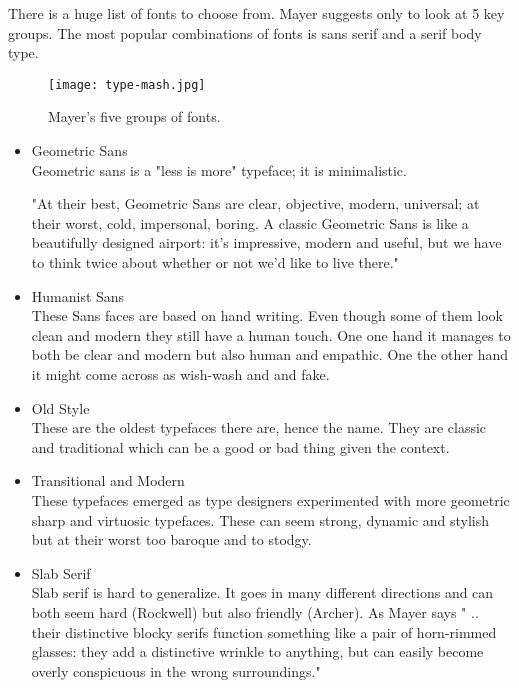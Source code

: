There is a huge list of fonts to choose from. Mayer suggests only to look at 5 key groups.
The most popular combinations of fonts is sans serif and a serif body type. \cite{TypeComb} 

\begin{figure}[H]
\centering
\texttt{[image: type-mash.jpg]}
\caption{Mayer's five groups of fonts. \cite{Font}}
\end{figure}

\begin{itemize}

\item
Geometric Sans
\\
Geometric sans is a "less is more" typeface; it is minimalistic.

"At their best, Geometric Sans are clear, objective, modern, universal; at their worst, cold, impersonal, boring. A classic Geometric Sans is like a beautifully designed airport: it's impressive, modern and useful, but we have to think twice about whether or not we'd like to live there." \cite{Font} %

\item
Humanist Sans
\\
These Sans faces are based on hand writing. Even though some of them look clean and modern they still have a human touch. One one hand it manages to both be clear and modern but also human and empathic. One the other hand it might come across as wish-wash and and fake. \cite{Font}

\item
Old Style
\\
These are the oldest typefaces there are, hence the name. 
They are classic and traditional which can be a good or bad thing given the context. 

\item
Transitional and Modern
\\
These typefaces emerged as type designers experimented with more geometric sharp and virtuosic typefaces. 
These can seem strong, dynamic and stylish but at their worst too baroque and to stodgy. \cite{Font} 

\item
Slab Serif
\\
Slab serif is hard to generalize. It goes in many different directions and can both seem hard (Rockwell) but also friendly (Archer). As Mayer says " .. their distinctive blocky serifs function something like a pair of horn-rimmed glasses: they add a distinctive wrinkle to anything, but can easily become overly conspicuous in the wrong surroundings." \cite{Font}
\end{itemize}

